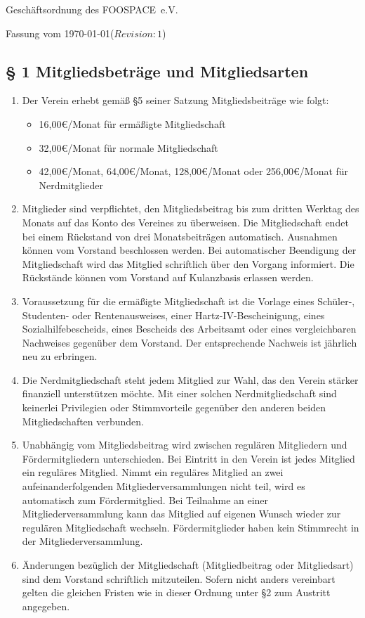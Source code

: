 \documentclass[10pt,a4paper]{article}
\newcommand{\name}{FOOSPACE}
\newcommand{\revision}{$Revision: 1$}
\begin{document}
{\LARGE Geschäftsordnung des \name\ e.V.}

Fassung vom \today (\revision)

\subsection*{§ 1 Mitgliedsbeträge und Mitgliedsarten}
\begin{enumerate}
\item Der Verein erhebt gemäß §5 seiner Satzung Mitgliedsbeiträge wie folgt:
	\begin{itemize}
	\item 16,00€/Monat für ermäßigte Mitgliedschaft
	\item 32,00€/Monat für normale Mitgliedschaft
	\item 42,00€/Monat, 64,00€/Monat, 128,00€/Monat oder 256,00€/Monat für Nerdmitglieder
	\end{itemize}
\item Mitglieder sind verpflichtet, den Mitgliedsbeitrag bis zum dritten Werktag des Monats
	auf das Konto des Vereines zu überweisen. Die Mitgliedschaft endet bei einem Rückstand
	von drei Monatsbeiträgen automatisch. Ausnahmen können vom Vorstand beschlossen werden.
	Bei automatischer Beendigung der Mitgliedschaft wird das Mitglied schriftlich über den
	Vorgang informiert. Die Rückstände können vom Vorstand auf Kulanzbasis erlassen werden.
\item Voraussetzung für die ermäßigte Mitgliedschaft ist die Vorlage eines
	Schüler-, Studenten- oder Rentenausweises, einer Hartz-IV-Bescheinigung,
	eines Sozialhilfebescheids, eines Bescheids des Arbeitsamt
	oder eines vergleichbaren Nachweises gegenüber dem Vorstand.
	Der entsprechende Nachweis ist jährlich neu zu erbringen.
\item Die Nerdmitgliedschaft steht jedem Mitglied zur Wahl, das den Verein stärker
	finanziell unterstützen möchte. Mit einer solchen
	Nerdmitgliedschaft sind keinerlei Privilegien oder Stimmvorteile gegenüber
	den anderen beiden Mitgliedschaften verbunden.
\item Unabhängig vom Mitgliedsbeitrag wird zwischen regulären Mitgliedern und Fördermitgliedern
	unterschieden. Bei Eintritt in den Verein ist jedes Mitglied ein reguläres Mitglied.
	Nimmt ein reguläres Mitglied an zwei aufeinanderfolgenden Mitgliederversammlungen nicht
	teil, wird es automatisch zum Fördermitglied. Bei Teilnahme an einer Mitgliederversammlung
	kann das Mitglied auf eigenen Wunsch wieder zur regulären Mitgliedschaft wechseln.
	Fördermitglieder haben kein Stimmrecht in der Mitgliederversammlung.

\item Änderungen bezüglich der Mitgliedschaft (Mitgliedbeitrag oder Mitgliedsart)
	sind dem Vorstand schriftlich mitzuteilen. Sofern nicht anders
	vereinbart gelten die gleichen Fristen wie in dieser Ordnung unter §2
	zum Austritt angegeben.
\end{enumerate}
\end{document}
